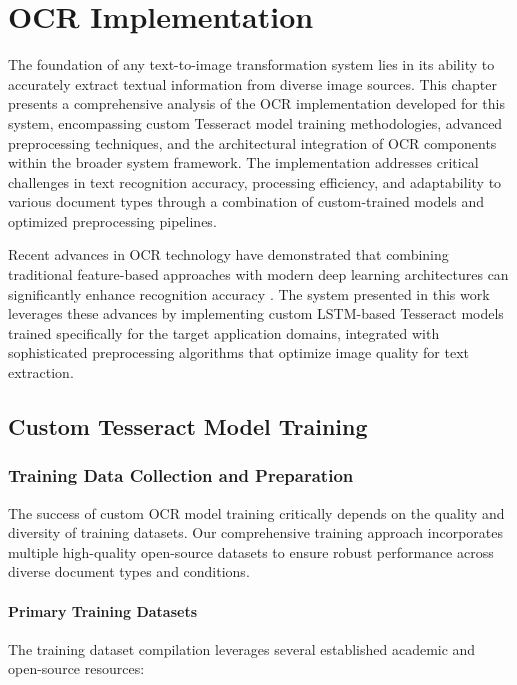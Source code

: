 \chapter{OCR Implementation}

The foundation of any text-to-image transformation system lies in its ability to accurately extract textual information from diverse image sources. This chapter presents a comprehensive analysis of the OCR implementation developed for this system, encompassing custom Tesseract model training methodologies, advanced preprocessing techniques, and the architectural integration of OCR components within the broader system framework. The implementation addresses critical challenges in text recognition accuracy, processing efficiency, and adaptability to various document types through a combination of custom-trained models and optimized preprocessing pipelines.

Recent advances in OCR technology have demonstrated that combining traditional feature-based approaches with modern deep learning architectures can significantly enhance recognition accuracy \cite{clausner2020optical}. The system presented in this work leverages these advances by implementing custom LSTM-based Tesseract models trained specifically for the target application domains, integrated with sophisticated preprocessing algorithms that optimize image quality for text extraction.

\section{Custom Tesseract Model Training}

\subsection{Training Data Collection and Preparation}

The success of custom OCR model training critically depends on the quality and diversity of training datasets. Our comprehensive training approach incorporates multiple high-quality open-source datasets to ensure robust performance across diverse document types and conditions.

\subsubsection{Primary Training Datasets}

The training dataset compilation leverages several established academic and open-source resources:

